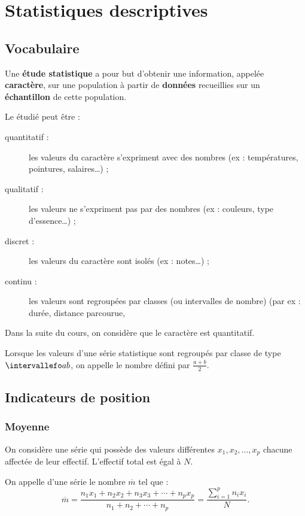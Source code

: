 \documentclass[10pt,openright,twoside,french]{book}
\begin{document}
\chapter{Statistiques descriptives}\label{ch_stats}

\section{Vocabulaire}

Une \textbf{étude statistique} a pour but d'obtenir une information, appelée \textbf{caractère}, sur une population à partir de \textbf{données} recueillies sur un \textbf{échantillon} de cette population.

\begin{Defi}
    Le  étudié peut être :
    \begin{description}
        \item[quantitatif :] les valeurs du caractère s'expriment avec des nombres (ex : températures, pointures, salaires\ldots) ;
        \item[qualitatif :] les valeurs ne s'expriment pas par des nombres (ex : couleurs, type d'essence\ldots) ;
        \item[discret :] les valeurs du caractère sont isolés (ex : notes\ldots) ;
        \item[continu :] les valeurs sont regroupées par classes (ou intervalles de nombre) (par ex : durée, distance parcourue,
    \end{description}
\end{Defi}

\begin{Rmq}
    Dans la suite du cours, on considère que le caractère est quantitatif.
\end{Rmq}

\begin{Defi}
    Lorsque les valeurs d'une série statistique sont regroupés par classe de type $\intervallefo a b$, on appelle  le nombre défini par $\frac{a + b}{2}$.
\end{Defi}

\section{Indicateurs de position}
\subsection{Moyenne}
\begin{Defi}
On considère une série qui possède des valeurs différentes $x_1, x_2, \ldots, x_p$ chacune affectée de leur effectif. L'effectif total est égal à $N$.\par
On appelle  d'une série le nombre $\overline{m}$ tel que :
\[\overline{m} = \frac{n_1x_1 + n_2x_2 + n_3x_3 + \cdots + n_px_p}{n_1 + n_2 + \cdots + n_p} = \frac{\displaystyle\sum_{i =1}^{p}n_ix_i}{N}.\]
\end{Defi}
\end{document}
